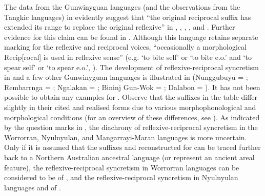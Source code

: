 The data from the Gunwinyguan languages (and the observations from the Tangkic languages) in  evidently suggest that “the original reciprocal suffix has extended its range to replace the original reflexive” in , , , , and  \citep[343]{alpher:al:2003}. Further evidence for this claim can be found in . Although this language retains separate marking for the reflexive and reciprocal voices, “occasionally a morphological Recip[rocal] is used in reflexive sense” (e.g.  ‘to bite self’ or ‘to bite e.o.’ and  ‘to spear self’ or ‘to spear e.o.’, \citealt[392]{heath:1984}). The development of reflexive-reciprocal syncretism in  and a few other Gunwinyguan languages is illustrated in  (Nunggubuyu = \citealt[392]{heath:1984}; Rembarrnga = \citealt[278, 282]{mckay:1975}; Ngalakan = \citealt[193, 215]{merlan:1983}; Bininj Gun-Wok = \citealt[444]{evans:2003}; Dalabon = \citealt{evans:2017}). It has not been possible to obtain any examples for . Observe that the suffixes in the table differ slightly in their cited and realised forms due to various morphophonological and morphological conditions (for an overview of these differences, see \citealt[342]{alpher:al:2003}). As indicated by the question marks in , the diachrony of reflexive-reciprocal syncretism in the Worrorran, Nyulnyulan, and Mangarrayi-Maran languages is more uncertain. Only if it is assumed that the suffixes  and  reconstructed for  can be traced further back to a Northern Australian ancestral language (or represent an ancient areal feature), the reflexive-reciprocal syncretism in Worrorran languages can be considered to be of , and the reflexive-reciprocal syncretism in Nyulnyulan languages and  of .

